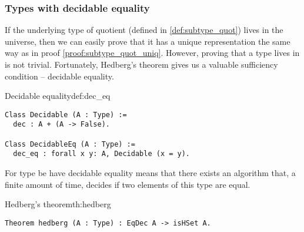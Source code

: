 \subsubsection{Types with decidable equality}
If the underlying type of quotient (defined in \ref{def:subtype_quot}) lives in the  universe, then we can easily prove that it has a unique representation the same way as in proof \ref{proof:subtype_quot_uniq}. However, proving that a type lives in  is not trivial. Fortunately, Hedberg's theorem \cite{hedberg_1998} gives us a valuable sufficiency condition -- decidable equality.
\begin{defi}{Decidable equality}{def:dec_eq}
\begin{verbatim}
Class Decidable (A : Type) :=
  dec : A + (A -> False).
  
Class DecidableEq (A : Type) :=
  dec_eq : forall x y: A, Decidable (x = y).
\end{verbatim}
\end{defi}
For type be have decidable equality means that there exists an algorithm that, a finite amount of time, decides if two elements of this type are equal.
\begin{theo}{Hedberg's theorem}{th:hedberg}
\begin{verbatim}
Theorem hedberg (A : Type) : EqDec A -> isHSet A.
\end{verbatim}
\end{theo}
